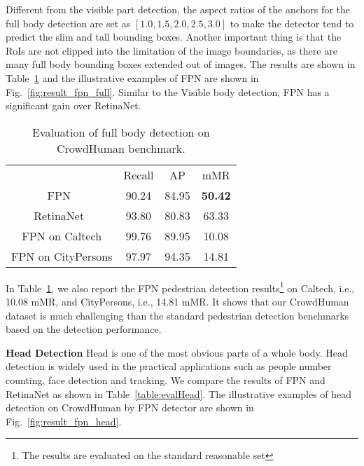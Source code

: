 \documentclass[10pt,twocolumn,letterpaper]{article}
\newcommand{\myparagraph}[1]{{\vspace{0.5em} \noindent \bf #1}}
\begin{document}
Different from the visible part detection, the aspect ratios of the anchors for the full body detection are set as $[1.0, 1.5, 2.0, 2.5, 3.0]$ to make the detector tend to predict the slim and tall bounding boxes. Another important thing is that the RoIs are not clipped into the limitation of the image boundaries, as there are many full body bounding boxes extended out of images. The results are shown in Table~\ref{table:evalfull} and the illustrative examples of FPN are shown in Fig.~\ref{fig:result_fpn_full}. Similar to the Visible body detection, FPN has a significant gain over RetinaNet. 


\setlength{\tabcolsep}{4pt}
\begin{table}
\begin{center}
\caption{Evaluation of full body detection on CrowdHuman benchmark.}
\label{table:evalfull}
\begin{tabular}{cccc}
\hline\noalign{\smallskip}
{} & Recall & AP & mMR\\
\noalign{\smallskip}
\hline
\noalign{\smallskip}
FPN~\cite{lin2017feature} & {90.24} & {84.95} & {\textbf{50.42}}\\
RetinaNet~\cite{lin2017focal} & {93.80} & {80.83} & {63.33}\\
\hline
\hline
FPN on Caltech & {99.76}  & {89.95} & {10.08}\\
FPN on CityPersons & {97.97} & {94.35} & {14.81}\\
\hline
\end{tabular}
\end{center}
\end{table}
\setlength{\tabcolsep}{1.4pt}

In Table~\ref{table:evalfull}, we also report the FPN pedestrian detection results\footnote{The results are evaluated on the standard reasonable set} on Caltech, i.e., 10.08 mMR, and CityPersons, i.e., 14.81 mMR. It shows that our CrowdHuman dataset is much challenging than the standard pedestrian detection benchmarks based on the detection performance.


\myparagraph{Head Detection} Head is one of the most obvious parts of a whole body. Head detection is widely used in the practical applications such as people number counting, face detection and tracking. We compare the results of FPN and RetinaNet as shown in Table~\ref{table:evalHead}. The illustrative examples of head detection on CrowdHuman by FPN detector are shown in Fig.~\ref{fig:result_fpn_head}.
\end{document}
